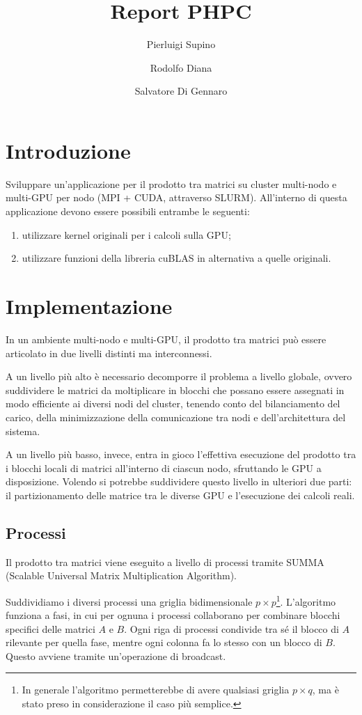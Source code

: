 \documentclass[a4paper]{article}
\title{Report PHPC}
\author{Pierluigi Supino \and Rodolfo Diana \and Salvatore Di Gennaro}
\begin{document}
\maketitle
\tableofcontents

\section{Introduzione}

Sviluppare un’applicazione per il prodotto tra matrici su cluster multi-nodo e multi-GPU per nodo (MPI + CUDA, attraverso SLURM). All’interno di questa applicazione devono essere possibili entrambe le seguenti:
\begin{enumerate}
    \item utilizzare kernel originali per i calcoli sulla GPU;
    \item utilizzare funzioni della libreria cuBLAS in alternativa a quelle originali.
\end{enumerate}

\section{Implementazione}
In un ambiente multi-nodo e multi-GPU, il prodotto tra matrici può essere articolato in due livelli distinti ma interconnessi.

A un livello più alto è necessario decomporre il problema a livello globale, ovvero suddividere le matrici da moltiplicare in blocchi che possano essere assegnati in modo efficiente ai diversi nodi del cluster, tenendo conto del bilanciamento del carico, della minimizzazione della comunicazione tra nodi e dell'architettura del sistema.

A un livello più basso, invece, entra in gioco l’effettiva esecuzione del prodotto tra i blocchi locali di matrici all’interno di ciascun nodo, sfruttando le GPU a disposizione. Volendo si potrebbe suddividere questo livello in ulteriori due parti: il partizionamento delle matrice tra le diverse GPU e l'esecuzione dei calcoli reali.

\subsection{Processi}
Il prodotto tra matrici viene eseguito a livello di processi tramite SUMMA (Scalable Universal Matrix Multiplication Algorithm)\cite{SUMMA}.

Suddividiamo i diversi processi una griglia bidimensionale $p \times p$\footnote{In generale l'algoritmo permetterebbe di avere qualsiasi griglia $p \times q$, ma è stato preso in considerazione il caso più semplice.}. L'algoritmo funziona a fasi, in cui per ognuna i processi collaborano per combinare blocchi specifici delle matrici $A$ e $B$. Ogni riga di processi condivide tra sé il blocco di $A$ rilevante per quella fase, mentre ogni colonna fa lo stesso con un blocco di $B$. Questo avviene tramite un’operazione di broadcast.
\end{document}
